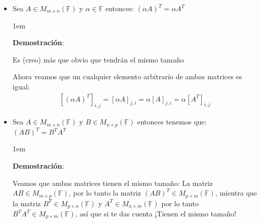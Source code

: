 \documentclass[12pt, fleqn]{report}                             %
\newenvironment{SmallIndentation}[1][0.75em]                    %
    {\begin{adjustwidth}{#1}{}\begin{footnotesize}}                 %
    {\end{footnotesize}\end{adjustwidth}}                           %
\begin{document}
\begin{itemize}
\begin{SmallIndentation}[1em]
                        \end{SmallIndentation}

                    \item Sea $A \in M_{m \times n}(\mathbb{F})$ y $\alpha \in \mathbb{F}$ entonces:
                        $(\alpha A)^T = \alpha A^T$
                        
                        \begin{SmallIndentation}[1em]
                            \textbf{Demostración}:

                            Es (creo) más que obvio que tendrán el mismo tamaño

                            Ahora veamos que un cualquier elemento arbitrario de ambas matrices es igual:
                            \begin{equation*}
                            \begin{split}
                                [(\alpha A)^T]_{i, j}    
                                    = [\alpha A]_{j, i}               
                                    = \alpha [A]_{j, i}
                                = \alpha [A^T]_{i, j}
                            \end{split}
                            \end{equation*}

                        \end{SmallIndentation}
                                    


                    \item Sea $A \in M_{m \times n}(\mathbb{F})$ y $B \in M_{n \times p}(\mathbb{F})$
                        entonces tenemos que: $(AB)^T = B^T A^T$

                        \begin{SmallIndentation}[1em]
                            \textbf{Demostración}:

                            Veamos que ambas matrices tienen el mismo tamaño: 
                            La matriz $AB \in M_{m \times p}(\mathbb{F})$, por lo tanto la matriz
                            $(AB)^T \in M_{p \times m}(\mathbb{F})$, mientra que la matriz 
                            $B^T \in M_{p \times n}(\mathbb{F})$ y $A^T \in M_{n \times m}(\mathbb{F})$
                            por lo tanto $B^T A^T \in M_{p \times m}(\mathbb{F})$, así que si te das
                            cuenta ¡Tienen el mismo tamaño!


\end{SmallIndentation}
\end{itemize}
\end{document}
